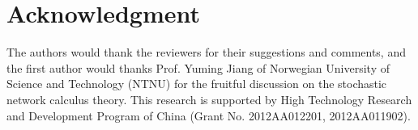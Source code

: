 \documentclass[12pt]{article}
\begin{document}
\section*{Acknowledgment}
The authors would thank the reviewers for their suggestions and comments, and the first author would thanks Prof. Yuming Jiang of Norwegian University of Science and Technology (NTNU) for the fruitful discussion on the stochastic network calculus theory. This research is supported by High Technology Research and Development Program of China (Grant No. 2012AA012201, 2012AA011902).

\end{document}
